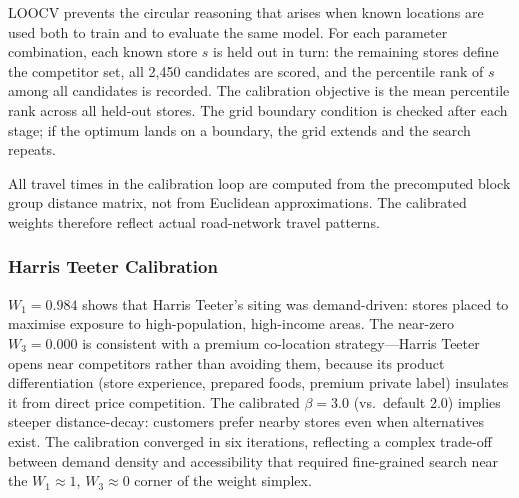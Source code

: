 \documentclass[conference]{IEEEtran}
\begin{document}
LOOCV prevents the circular reasoning that arises when known locations
are used both to train and to evaluate the same model. For each
parameter combination, each known store $s$ is held out in turn: the
remaining stores define the competitor set, all 2{,}450 candidates
are scored, and the percentile rank of $s$ among all candidates is
recorded. The calibration objective is the mean percentile rank
across all held-out stores. The grid boundary condition is checked
after each stage; if the optimum lands on a boundary, the grid
extends and the search repeats.

All travel times in the calibration loop are computed from the
precomputed block group distance matrix, not from Euclidean
approximations. The calibrated weights therefore reflect actual
road-network travel patterns.

\subsubsection{Harris Teeter Calibration}

\begin{table}[!t]
\centering
\caption{V2: Harris Teeter Calibrated Weights \& Configuration Comparison
         (28 HT stores, 2,450 candidates)}
\label{tab:v2_ht}
\end{table}

$W_1 = 0.984$ shows that Harris Teeter's siting was demand-driven:
stores placed to maximise exposure to high-population, high-income
areas. The near-zero $W_3 = 0.000$ is consistent with a premium
co-location strategy---Harris Teeter opens near competitors rather
than avoiding them, because its product differentiation (store
experience, prepared foods, premium private label) insulates it from
direct price competition. The calibrated $\beta = 3.0$ (vs.\ default
2.0) implies steeper distance-decay: customers prefer nearby stores
even when alternatives exist. The calibration converged in six
iterations, reflecting a complex trade-off between demand density
and accessibility that required fine-grained search near the
$W_1 \approx 1$, $W_3 \approx 0$ corner of the weight simplex.
\end{document}
